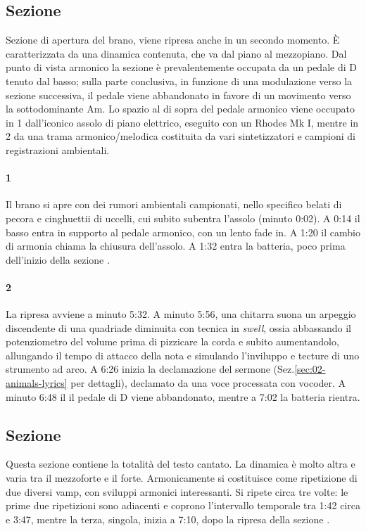 \documentclass[class=book, crop=false, oneside, 12pt]{standalone}
\begin{document}
    \subsection{Sezione }
    Sezione di apertura del brano, viene ripresa anche in un secondo momento. È caratterizzata da una dinamica contenuta, che va dal piano al mezzopiano. Dal punto di vista armonico la sezione è prevalentemente occupata da un pedale di D tenuto dal basso; sulla parte conclusiva, in funzione di una modulazione verso la sezione successiva, il pedale viene abbandonato in favore di un movimento verso la sottodominante Am. Lo spazio al di sopra del pedale armonico viene occupato in 1 dall'iconico assolo di piano elettrico, eseguito con un Rhodes Mk I, mentre in 2 da una trama armonico/melodica costituita da vari sintetizzatori e campioni di registrazioni ambientali.

    \paragraph{1} 
    Il brano si apre con dei rumori ambientali campionati, nello specifico belati di pecora e cinghuettii di uccelli, cui subito  subentra l'assolo (minuto 0:02). A 0:14 il basso entra in supporto al pedale armonico, con un lento fade in. A 1:20 il cambio di armonia chiama la chiusura dell'assolo. A 1:32 entra la batteria, poco prima dell'inizio della sezione .

    \paragraph{2} 
    La ripresa avviene a minuto 5:32. A minuto 5:56,  una chitarra suona un arpeggio discendente di una quadriade diminuita con tecnica in \emph{swell}, ossia abbassando il potenziometro del volume prima di pizzicare la corda e subito aumentandolo, allungando il tempo di attacco della nota e simulando l'inviluppo e tecture di uno strumento ad arco. A 6:26 inizia la declamazione del sermone (Sez.\ref{sec:02-animals-lyrics} per dettagli), declamato da una voce processata con vocoder. A minuto 6:48 il il pedale di D viene abbandonato, mentre a 7:02 la batteria rientra.

    \subsection{Sezione }
    Questa sezione contiene la totalità del testo cantato. La dinamica è molto altra e varia tra il mezzoforte e il forte. Armonicamente si costituisce come ripetizione di due diversi vamp, con sviluppi armonici interessanti. Si ripete circa tre volte: le prime due ripetizioni sono adiacenti e coprono l'intervallo temporale tra 1:42 circa e 3:47, mentre la terza, singola,  inizia a 7:10, dopo la ripresa della sezione .
\end{document}
